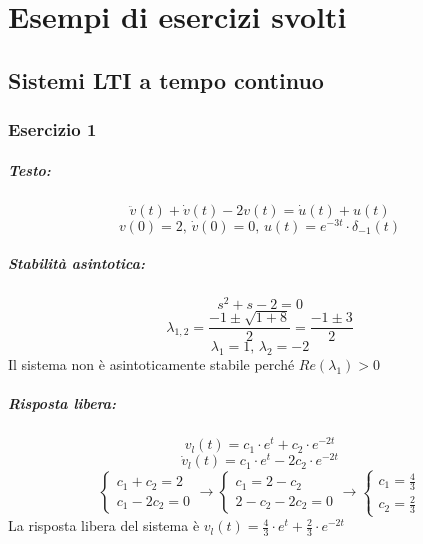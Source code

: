 \documentclass[a4paper,oneside,titlepage]{book}
\begin{document}
\appendix
\chapter{Esempi di esercizi svolti}

\section{Sistemi LTI a tempo continuo}

\subsection{Esercizio 1}
\paragraph{Testo:}
\[ \ddot{v}(t) + \dot{v}(t)	- 2 v(t) = \dot{u}(t) + u(t) \]
\[ v(0) = 2, \, \dot{v}(0) = 0, \, u(t) = e^{-3t} \cdot \delta_{-1}(t) \]

\paragraph{Stabilità asintotica:}
\[ s^2 + s - 2 = 0 \]
\[ \lambda_{1,2} = \frac{-1 \pm \sqrt{1 + 8}}{2} = \frac{-1 \pm 3}{2}\]
\[ \lambda_1 = 1, \, \lambda_2 = -2 \]
Il sistema non è asintoticamente stabile perché $Re(\lambda_1)>0$

\paragraph{Risposta libera:}
\[ v_l(t) = c_1 \cdot e^t + c_2 \cdot e^{-2t} \]
\[ \dot{v}_l(t) = c_1 \cdot e^t - 2 c_2 \cdot e^{-2t} \]
\[
\begin{cases}
c_1 + c_2 = 2 \\
c_1 - 2 c_2 = 0
\end{cases}
\longrightarrow
\begin{cases}
c_1 = 2 - c_2 \\
2 - c_2 -2 c_2 = 0
\end{cases}
\longrightarrow
\begin{cases}
c_1 = \frac{4}{3} \\
c_2 = \frac{2}{3}
\end{cases}
\]
La risposta libera del sistema è $v_l(t) = \frac{4}{3} \cdot e^t + \frac{2}{3} \cdot e^{-2t}$
\end{document}
